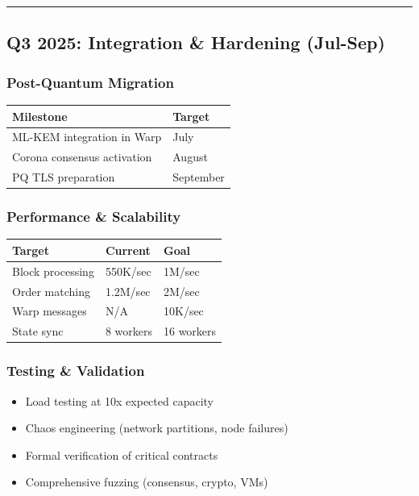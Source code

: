 \documentclass[
]{article}
\newcounter{none} %
\providecommand{\tightlist}{%
  \setlength{\itemsep}{0pt}\setlength{\parskip}{0pt}}
\begin{document}
\begin{center}\rule{0.5\linewidth}{0.5pt}\end{center}

\subsection{Q3 2025: Integration \& Hardening
(Jul-Sep)}\label{q3-2025-integration--hardening-jul-sep}

\subsubsection{Post-Quantum Migration}\label{post-quantum-migration}

{\def\LTcaptype{none} %
\begin{longtable}[]{@{}ll@{}}
\toprule\noalign{}
Milestone & Target \\
\midrule\noalign{}
\endhead
\bottomrule\noalign{}
\endlastfoot
ML-KEM integration in Warp & July \\
Corona consensus activation & August \\
PQ TLS preparation & September \\
\end{longtable}
}

\subsubsection{Performance \&
Scalability}\label{performance--scalability}

{\def\LTcaptype{none} %
\begin{longtable}[]{@{}lll@{}}
\toprule\noalign{}
Target & Current & Goal \\
\midrule\noalign{}
\endhead
\bottomrule\noalign{}
\endlastfoot
Block processing & 550K/sec & 1M/sec \\
Order matching & 1.2M/sec & 2M/sec \\
Warp messages & N/A & 10K/sec \\
State sync & 8 workers & 16 workers \\
\end{longtable}
}

\subsubsection{Testing \& Validation}\label{testing--validation}

\begin{itemize}
\tightlist
\item[$\square$]
  Load testing at 10x expected capacity
\item[$\square$]
  Chaos engineering (network partitions, node failures)
\item[$\square$]
  Formal verification of critical contracts
\item[$\square$]
  Comprehensive fuzzing (consensus, crypto, VMs)
\end{itemize}
\end{document}
